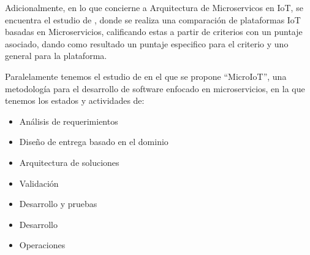 \documentclass[stu,12pt,floatsintext]{apa7}
\begin{document}
		Adicionalmente, en lo que concierne a Arquitectura de Microservicos en IoT, se encuentra el estudio de \cite{Khalyly2020}, donde se realiza una comparación de plataformas IoT basadas en Microservicios, calificando estas a partir de criterios con un puntaje asociado, dando como resultado un puntaje especifico para el criterio y uno general para la plataforma.
		
		Paralelamente tenemos el estudio de \cite{9284589} en el que se propone ``MicroIoT'', una metodología para el desarrollo de software enfocado en microservicios, en la que tenemos los estados y actividades de:
		\begin{itemize}
			\item Análisis de requerimientos
			\item Diseño de entrega basado en el dominio
			\item Arquitectura de soluciones
			\item Validación
			\item Desarrollo y pruebas
			\item Desarrollo
			\item Operaciones
		\end{itemize}
	
	
\end{document}
